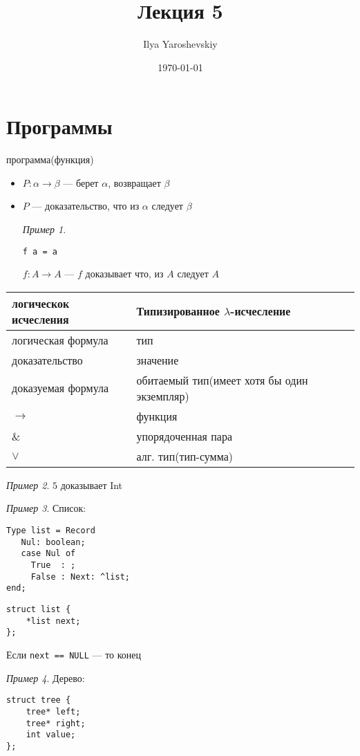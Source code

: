 \documentclass[english]{article}
\author{Ilya Yaroshevskiy}
\date{\today}
\title{Лекция 5}
\theoremstyle{plain}
\theoremstyle{remark}
\newtheorem*{examp}{Пример}
\theoremstyle{definition}
\begin{document}
\maketitle
\tableofcontents


\section{Программы}
\label{sec:org6e1450b}
программа(функция)
\begin{itemize}
\item \(P: \alpha \to \beta\) --- берет \(\alpha\), возвращает \(\beta\)
\item \(P\) --- доказательство, что из \(\alpha\) следует \(\beta\)
\begin{examp}
\-
\begin{verbatim}
f a = a
\end{verbatim}
\(f: A \to A\) --- \(f\) доказывает что, из \(A\) следует \(A\)
\end{examp}
\end{itemize}

\begin{center}
\begin{tabular}{ll}
логическок исчесления & Типизированное \(\lambda\)-исчесление\\
\hline
логическая формула & тип\\
доказательство & значение\\
доказуемая формула & обитаемый тип(имеет хотя бы один экземпляр)\\
\(\to\) & функция\\
\& & упорядоченная пара\\
\(\vee\) & алг. тип(тип-сумма)\\
\end{tabular}
\end{center}
\begin{examp}
\(5\) доказывает Int
\end{examp}
\begin{examp}
Список:
\begin{verbatim}
Type list = Record
   Nul: boolean;
   case Nul of
     True  : ;
     False : Next: ^list;
end;
\end{verbatim}
\begin{verbatim}
struct list {
	*list next;
};
\end{verbatim}
Если \texttt{next == NULL} --- то конец
\end{examp}
\begin{examp}
Дерево:
\begin{verbatim}
struct tree {
	tree* left;
	tree* right;
	int value;
};
\end{verbatim}
\end{examp}
\end{document}
